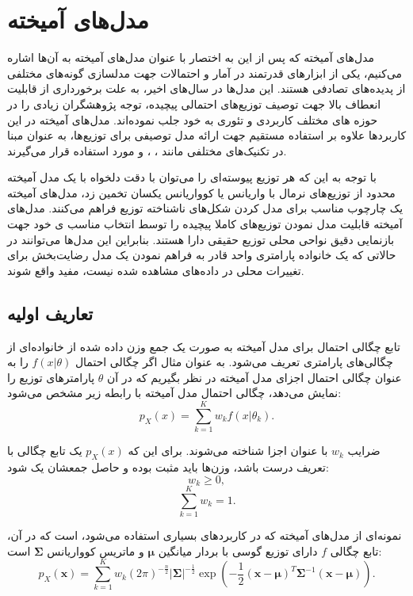 \chapter{مدل‌های آمیخته} \label{ch:mixtureModels}
مدل‌های آمیخته
{}
که پس از این به اختصار با عنوان مدل‌های آمیخته به آن‌ها اشاره می‌کنیم، یکی از ابزارهای قدرتمند در آمار و احتمالات جهت مدلسازی گونه‌های مختلفی از پدیده‌های تصادفی هستند.
این مدل‌ها در سال‌های اخیر، به علت  برخورداری از قابلیت انعطاف بالا جهت توصیف توزیع‌های احتمالی پیچیده، توجه پژوهشگران زیادی را در حوزه های مختلف کاربردی و تئوری به خود جلب نموده‌اند.
مدل‌های آمیخته در این کاربردها علاوه بر استفاده مستقیم جهت ارائه مدل توصیفی برای توزیع‌ها، به عنوان مبنا در تکنیک‌های مختلفی مانند
{}،
{}،
{} و
{} مورد استفاده قرار می‌گیرند{\cite{mclachlan_finite_2004}}.

با توجه به این که هر توزیع پیوسته‌ای را می‌توان با دقت دلخواه با یک مدل آمیخته محدود از توزیع‌های نرمال با واریانس یا کوواریانس یکسان تخمین زد، مدل‌های آمیخته یک چارچوب
{} مناسب برای مدل کردن شکل‌های ناشناخته توزیع فراهم می‌کنند. مدل‌های آمیخته قابلیت مدل نمودن توزیع‌های کاملا پیچیده را توسط انتخاب مناسب
{}ی خود جهت بازنمایی دقیق  نواحی محلی
{} توزیع حقیقی دارا هستند.
بنابراین این مدل‌ها می‌توانند در حالاتی که یک خانواده پارامتری واحد قادر به فراهم نمودن یک مدل رضایت‌بخش برای تغییرات محلی در داده‌های مشاهده شده نیست، مفید واقع شوند.

\section{تعاریف اولیه}
تابع چگالی احتمال برای مدل آمیخته به صورت یک جمع وزن داده شده از خانواده‌ای از چگالی‌های پارامتری تعریف می‌شود. به عنوان مثال اگر چگالی احتمال
$f(x|\theta)$
را به عنوان چگالی احتمال اجزای مدل آمیخته در نظر بگیریم که در آن
$\theta$
پارامترهای توزیع را نمایش می‌دهد، چگالی احتمال مدل آمیخته با رابطه زیر مشخص می‌شود:
$$p_X(x)=\sum_{k=1}^{K}w_k f(x|\theta_k).$$

ضرایب
$w_k$
با عنوان
{}
اجزا شناخته می‌شوند.
برای این که
$p_X(x)$
یک تابع چگالی با تعریف درست باشد، وزن‌ها باید مثبت بوده و حاصل جمعشان یک شود:
$$w_k \geq 0,$$
$$\sum_{k=1}^{K}w_k=1.$$

نمونه‌ای از مدل‌های آمیخته که در کاربردهای بسیاری استفاده می‌شود،
{}
است که در آن، تابع چگالی $f$ دارای توزیع گوسی با بردار میانگین
$\bm{\mu}$
و ماتریس کوواریانس
$\bm{\Sigma}$
است:
$$p_X(\bm{x})=\sum_{k=1}^{K}w_k (2\pi)^{-\frac{n}{2}}|\bm{\Sigma}|^{-\frac{1}{2}}
 \exp\left(-\frac{1}{2}(\bm{x}-\bm{\mu})^T\bm{\Sigma}^{-1}(\bm{x}-\bm{\mu}) \right).$$

